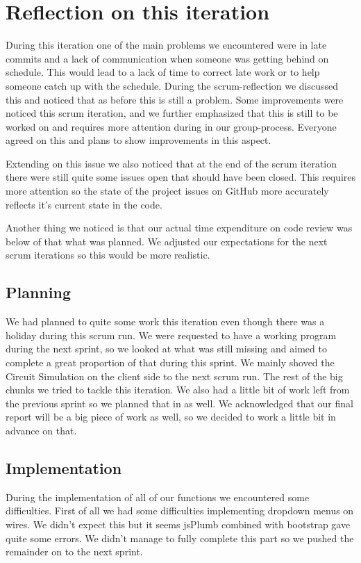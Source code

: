 \documentclass[a4paper]{article}
\begin{document}
\pagebreak

\section{Reflection on this iteration}
During this iteration one of the main problems we encountered were in late commits and a lack of communication when someone was getting behind on schedule. This would lead to a lack of time to correct late work or to help someone catch up with the schedule. During the scrum-reflection we discussed this and noticed that as before this is still a problem. Some improvements were noticed this scrum iteration, and we further emphasized that this is still to be worked on and requires more attention during in our group-process. Everyone agreed on this and plans to show improvements in this aspect.

Extending on this issue we also noticed that at the end of the scrum iteration there were still quite some issues open that should have been closed. This requires more attention so the state of the project issues on GitHub more accurately reflects it's current state in the code.

Another thing we noticed is that our actual time expenditure on code review was below of that what was planned. We adjusted our expectations for the next scrum iterations so this would be more realistic.\\

\subsection{Planning}
We had planned to quite some work this iteration even though there was a holiday during this scrum run. We were requested to have a working program during the next sprint, so we looked at what was still missing and aimed to complete a great proportion of that during this sprint. We mainly shoved the Circuit Simulation on the client side to the next scrum run. The rest of the big chunks we tried to tackle this iteration. We also had a little bit of work left from the previous sprint so we planned that in as well. We acknowledged that our final report will be a big piece of work as well, so we decided to work a little bit in advance on that.
 
\subsection{Implementation}
During the implementation of all of our functions we encountered some difficulties. First of all we had some difficulties implementing dropdown menus on wires. We didn't expect this but it seems jsPlumb combined with bootstrap gave quite some errors. We didn't manage to fully complete this part so we pushed the remainder on to the next sprint.
\end{document}
